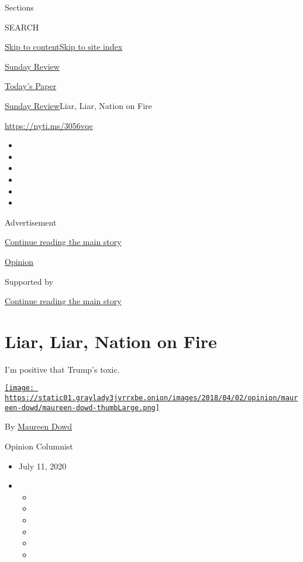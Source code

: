 Sections

SEARCH

\protect\hyperlink{site-content}{Skip to
content}\protect\hyperlink{site-index}{Skip to site index}

\href{https://www.nytimes3xbfgragh.onion/section/opinion/sunday}{Sunday
Review}

\href{https://myaccount.nytimes3xbfgragh.onion/auth/login?response_type=cookie\&client_id=vi}{}

\href{https://www.nytimes3xbfgragh.onion/section/todayspaper}{Today's
Paper}

\href{/section/opinion/sunday}{Sunday Review}\textbar{}Liar, Liar,
Nation on Fire

\href{https://nyti.ms/3056vqe}{https://nyti.ms/3056vqe}

\begin{itemize}
\item
\item
\item
\item
\item
\item
\end{itemize}

Advertisement

\protect\hyperlink{after-top}{Continue reading the main story}

\href{/section/opinion}{Opinion}

Supported by

\protect\hyperlink{after-sponsor}{Continue reading the main story}

\hypertarget{liar-liar-nation-on-fire}{%
\section{Liar, Liar, Nation on Fire}\label{liar-liar-nation-on-fire}}

I'm positive that Trump's toxic.

\href{https://www.nytimes3xbfgragh.onion/by/maureen-dowd}{\texttt{[image: https://static01.graylady3jvrrxbe.onion/images/2018/04/02/opinion/maureen-dowd/maureen-dowd-thumbLarge.png]}}

By \href{https://www.nytimes3xbfgragh.onion/by/maureen-dowd}{Maureen
Dowd}

Opinion Columnist

\begin{itemize}
\item
  July 11, 2020
\item
  \begin{itemize}
  \item
  \item
  \item
  \item
  \item
  \item
  \end{itemize}
\end{itemize}

